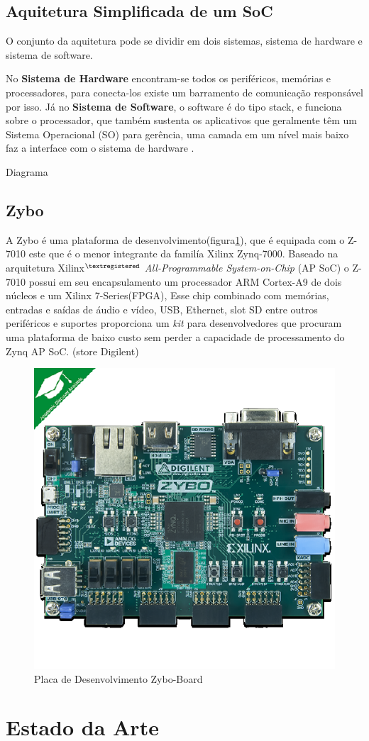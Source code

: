 \subsection{Aquitetura Simplificada de um SoC}

O conjunto da aquitetura pode se dividir em dois sistemas, sistema de
hardware  e sistema de software. 


No \textbf{Sistema de Hardware}
encontram-se todos os periféricos,
memórias e processadores, para conecta-los
existe um barramento de comunicação
responsável por isso.
Já no \textbf{Sistema de Software}, o software é do tipo stack, e funciona sobre o
processador, que também sustenta os aplicativos que geralmente têm um
Sistema Operacional (SO) para gerência, uma camada em um nível mais baixo
faz a interface com o sistema de hardware \cite{zynqBook}.

 Diagrama
\subsection{Zybo}
A Zybo é uma plataforma de desenvolvimento(figura\ref{Zybo Board}), que é equipada com o Z-7010
este que é  o menor integrante da familía Xilinx Zynq-7000.
Baseado na arquitetura Xilinx$^{\textregistered}$ \textit{All-Programmable System-on-Chip} (AP SoC)
o Z-7010 possui em seu encapsulamento um processador ARM Cortex-A9 de 
dois núcleos e um Xilinx 7-Series(FPGA), Esse chip combinado com memórias, entradas 
e saídas de áudio e vídeo, USB, Ethernet, slot SD entre outros periféricos e suportes
proporciona um \textit{kit} para desenvolvedores que procuram uma plataforma de baixo custo
sem perder a capacidade de processamento do Zynq AP SoC. (store Digilent)  

\begin{figure}[h]
	\centering
	\includegraphics[keepaspectratio=true,scale=1.0]{figuras/zyboboard.eps}
	\caption{Placa de Desenvolvimento Zybo-Board}
	\label{Zybo Board}
\end{figure}



\section{Estado da Arte}



